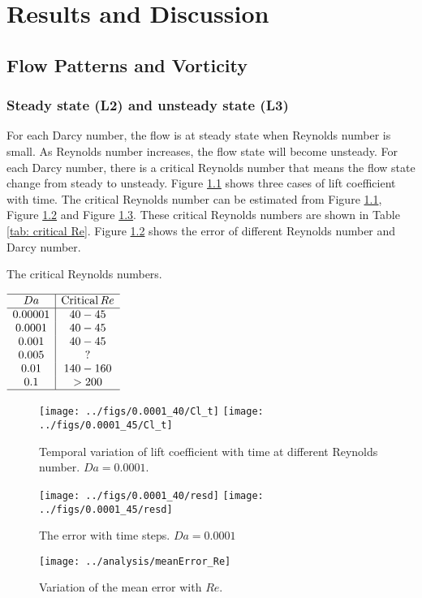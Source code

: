 \chapter{Results and Discussion}
\section{Flow Patterns and Vorticity}
\subsection{Steady state (L2) and unsteady state (L3)}
For each Darcy number, the flow is at steady state when Reynolds number is small. As Reynolds number increases, the flow state will become unsteady. For each Darcy number, there is a critical Reynolds number that means the flow state change from steady to unsteady. Figure \ref{fig: Cl_t} shows three cases of lift coefficient with time. The critical Reynolds number can be estimated from Figure \ref{fig: Cl_t}, Figure \ref{fig: resd} and Figure \ref{fig: error}.  These critical Reynolds numbers are shown in Table \ref{tab: critical Re}. Figure \ref{fig: resd} shows the error of different Reynolds number and Darcy number.

\begin{table}[]
	\centering
	\caption{The critical Reynolds numbers.}\label{tab: critical Re}
	$\begin{array}{c|c}
	\hline
	Da & \mathrm{Critical}\, Re \\ \hline
	0.00001& 40-45   \\
	0.0001 & 40-45 \\
	0.001  & 40-45 \\
	0.005  & ?   \\
	0.01   & 140-160 \\
	0.1    & >200\\
	\hline
	\end{array}$
\end{table}
\begin{figure}[H]
	\centering
	{\texttt{[image: ../figs/0.0001\_40/Cl\_t]}}
	{\texttt{[image: ../figs/0.0001\_45/Cl\_t]}}
	\caption{Temporal variation of lift coefficient with time at different Reynolds number. $Da=0.0001$.}
	\label{fig: Cl_t}
\end{figure}
\begin{figure}[H]
	\centering
	{\texttt{[image: ../figs/0.0001\_40/resd]}}
	{\texttt{[image: ../figs/0.0001\_45/resd]}}
	\caption{The error with time steps. $Da=0.0001$}
	\label{fig: resd}
\end{figure}
\begin{figure}[H]
	\centering
	\texttt{[image: ../analysis/meanError\_Re]}
	\caption{Variation of the mean error with $Re$.}
	\label{fig: error}
\end{figure}

